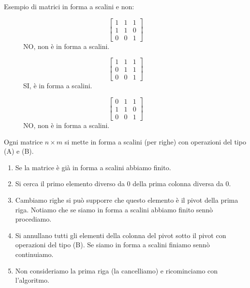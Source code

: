 \begin{example}
Esempio di matrici in forma a scalini e non:
\vspace{-10pt}
\begin{figure}[h!]
    \centering
    \begin{minipage}{.3\linewidth}
        \centering
        \[
            \begin{bmatrix}
            1 & 1 & 1\\
            1 & 1 & 0\\
            0 & 0 & 1
            \end{bmatrix}
        \]
        NO, non è in forma a scalini.
    \end{minipage}
    \begin{minipage}{.3\linewidth}
        \centering
        \[
            \begin{bmatrix}
            1 & 1 & 1\\
            0 & 1 & 1\\
            0 & 0 & 1
            \end{bmatrix}
        \]
        SI, è in forma a scalini.
    \end{minipage}
    \begin{minipage}{.3\linewidth}
        \centering
        \[
            \begin{bmatrix}
            0 & 1 & 1\\
            1 & 1 & 0\\
            0 & 0 & 1
            \end{bmatrix}
        \]
        NO, non è in forma a scalini.
     \end{minipage}
\end{figure}
\end{example}

\begin{definition}
Ogni matrice $n \times m$ si mette in forma a scalini (per righe) con operazioni del tipo (A) e (B).
\begin{enumerate}
    \item Se la matrice è già in forma a scalini abbiamo finito.
    \item Si cerca il primo elemento diverso da 0 della prima colonna diversa da 0.
    \item Cambiamo righe si può supporre che questo elemento è il pivot della prima riga. Notiamo che se siamo in forma a scalini abbiamo finito sennò procediamo.
    \item Si annullano tutti gli elementi della colonna del pivot sotto il pivot  con operazioni del tipo (B). Se siamo in forma a scalini finiamo sennò continuiamo.
    \item Non consideriamo la prima riga (la cancelliamo) e ricominciamo con l'algoritmo.
\end{enumerate}
\end{definition}


